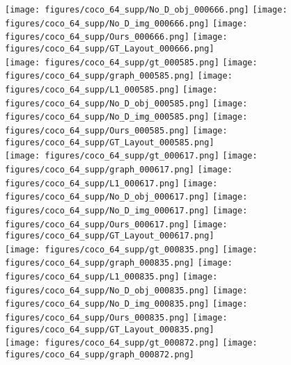 \documentclass[10pt,twocolumn,letterpaper]{article}
\begin{document}
\begin{figure*}
  \texttt{[image: figures/coco\_64\_supp/No\_D\_obj\_000666.png]}
  \texttt{[image: figures/coco\_64\_supp/No\_D\_img\_000666.png]}
  \texttt{[image: figures/coco\_64\_supp/Ours\_000666.png]}
  \texttt{[image: figures/coco\_64\_supp/GT\_Layout\_000666.png]} \\
  \texttt{[image: figures/coco\_64\_supp/gt\_000585.png]}
  \hspace*{6.6mm}\texttt{[image: figures/coco\_64\_supp/graph\_000585.png]}\hspace*{6.6mm}
  \texttt{[image: figures/coco\_64\_supp/L1\_000585.png]}
  \texttt{[image: figures/coco\_64\_supp/No\_D\_obj\_000585.png]}
  \texttt{[image: figures/coco\_64\_supp/No\_D\_img\_000585.png]}
  \texttt{[image: figures/coco\_64\_supp/Ours\_000585.png]}
  \texttt{[image: figures/coco\_64\_supp/GT\_Layout\_000585.png]} \\
  \texttt{[image: figures/coco\_64\_supp/gt\_000617.png]}
  \texttt{[image: figures/coco\_64\_supp/graph\_000617.png]}
  \texttt{[image: figures/coco\_64\_supp/L1\_000617.png]}
  \texttt{[image: figures/coco\_64\_supp/No\_D\_obj\_000617.png]}
  \texttt{[image: figures/coco\_64\_supp/No\_D\_img\_000617.png]}
  \texttt{[image: figures/coco\_64\_supp/Ours\_000617.png]}
  \texttt{[image: figures/coco\_64\_supp/GT\_Layout\_000617.png]} \\
  \texttt{[image: figures/coco\_64\_supp/gt\_000835.png]}
  \hspace*{1.8mm}\texttt{[image: figures/coco\_64\_supp/graph\_000835.png]}\hspace*{1.8mm}
  \texttt{[image: figures/coco\_64\_supp/L1\_000835.png]}
  \texttt{[image: figures/coco\_64\_supp/No\_D\_obj\_000835.png]}
  \texttt{[image: figures/coco\_64\_supp/No\_D\_img\_000835.png]}
  \texttt{[image: figures/coco\_64\_supp/Ours\_000835.png]}
  \texttt{[image: figures/coco\_64\_supp/GT\_Layout\_000835.png]} \\
  \texttt{[image: figures/coco\_64\_supp/gt\_000872.png]}
  \hspace*{5.2mm}\texttt{[image: figures/coco\_64\_supp/graph\_000872.png]}\hspace*{5.2mm}

\end{figure*}
\end{document}
